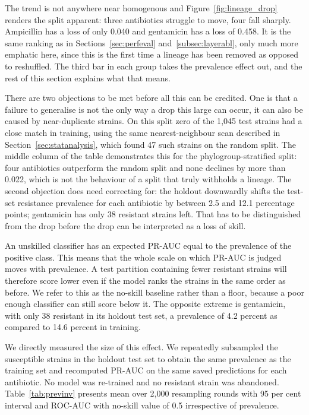 The trend is not anywhere near homogenous and Figure~\ref{fig:lineage_drop}
renders the split apparent: three antibiotics struggle to move, four fall
sharply. Ampicillin has a loss of only 0.040 and gentamicin has a loss of 0.458.
It is the same ranking as in Sections~\ref{sec:perfeval} and~\ref{subsec:layerabl},
only much more emphatic here, since this is the first time a lineage has been
removed as opposed to reshuffled. The third bar in each group takes the
prevalence effect out, and the rest of this section explains what that means.

\vspace{1em}

There are two objections to be met before all this can be credited. One is that a
failure to generalise is not the only way a drop this large can occur,
it can also be caused by near-duplicate strains. On this split zero of the
1{,}045 test strains had a close match in training, using the same
nearest-neighbour scan described in Section~\ref{sec:statanalysis}, which found
47 such strains on the random split. The middle column of the table demonstrates this for the
phylogroup-stratified split: four antibiotics outperform the random split
and none declines by more than 0.022, which is not the behaviour of a split
that truly withholds a lineage. The second
objection does need correcting for: the holdout downwardly shifts the test-set
resistance prevalence for each antibiotic by between 2.5 and 12.1 percentage
points; gentamicin has only 38 resistant strains left. That has to be
distinguished from the drop before the drop can be interpreted as a loss of
skill.

\vspace{1em}

An unskilled classifier has an expected PR-AUC equal to the prevalence of the
positive class. This means that the whole scale on which PR-AUC is judged
moves with prevalence. A test partition containing fewer resistant strains
will therefore score lower even if the model ranks the strains in the same
order as before. We refer to this as the no-skill baseline rather than a
floor, because a poor enough classifier can still score below it. The
opposite extreme is gentamicin, with only 38 resistant
in its holdout test set, a prevalence of 4.2 percent as compared to 14.6 percent
in training.

\vspace{1em}

We directly measured the size of this effect. We repeatedly subsampled the
susceptible strains in the holdout test set to obtain the same prevalence as the
training set and recomputed PR-AUC on the same saved predictions for each
antibiotic. No model was re-trained and no resistant strain was abandoned.
Table~\ref{tab:previnv} presents mean over 2{,}000 resampling rounds with 95 per
cent interval and ROC-AUC with no-skill value of 0.5 irrespective of prevalence.

